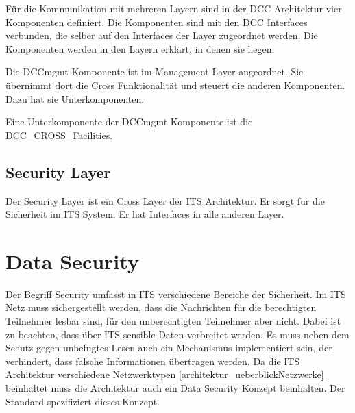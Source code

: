 Für die Kommunikation mit mehreren Layern sind in der  \ac{DCC} Architektur vier Komponenten definiert. Die Komponenten sind mit den \ac{DCC} Interfaces verbunden, die selber auf den Interfaces der Layer zugeordnet werden. Die Komponenten werden in den Layern erklärt, in denen sie liegen. 

Die DCCmgmt Komponente ist im Management Layer angeordnet. Sie übernimmt dort die Cross Funktionalität und steuert die anderen Komponenten. Dazu hat sie Unterkomponenten.

Eine Unterkomponente der DCCmgmt Komponente ist die DCC\_CROSS\_Facilities. 




\subsection{Security Layer \label{architektur_securityLayer}}
Der Security Layer ist ein Cross Layer der \ac{ITS} Architektur. Er sorgt für die Sicherheit im \ac{ITS} System. Er hat Interfaces in alle anderen Layer. 	 

\section{Data Security\label{architektur_dataSecurity}}
Der Begriff Security umfasst in \ac{ITS} verschiedene Bereiche der Sicherheit. Im \ac{ITS} Netz muss sichergestellt werden, dass die Nachrichten für die berechtigten Teilnehmer lesbar sind, für den unberechtigten Teilnehmer aber nicht. Dabei ist zu beachten, dass über \ac{ITS} sensible Daten verbreitet werden. Es muss neben dem Schutz gegen unbefugtes Lesen auch ein Mechanismus implementiert sein, der verhindert, dass falsche Informationen übertragen werden. Da die \ac{ITS} Architektur verschiedene Netzwerktypen \autoref{architektur_ueberblickNetzwerke} beinhaltet muss die Architektur auch ein Data Security Konzept beinhalten. Der Standard \cite{ts102940} spezifiziert dieses Konzept.  

